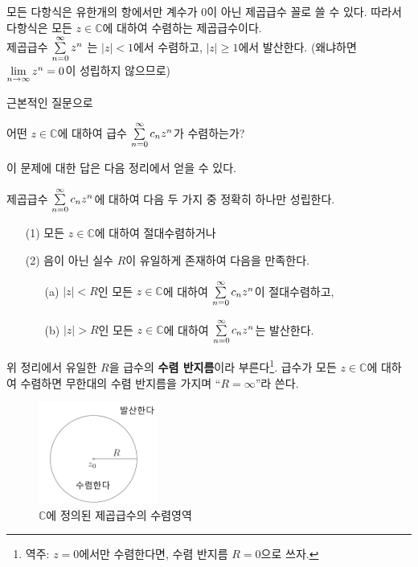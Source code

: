 \begin{saltexample}[label=example-4-1]{}{}
모든 다항식은 유한개의 항에서만 계수가 $0$이 아닌 제곱급수 꼴로 쓸 수 있다.
따라서 다항식은 모든 $z\in\mathbb C$에 대하여 수렴하는 제곱급수이다. \\[1ex]

제곱급수  
$
\sum\limits_{n=0}^\infty z^n
$
는 $|z|<1$에서 수렴하고,
$|z|\ge1$에서 발산한다. (왜냐하면 $\lim\limits_{n\to\infty} z^n = 0$이 성립하지 않으므로)
\end{saltexample}

근본적인 질문으로 
\begin{center}
어떤 $z\in\mathbb C$에 대하여  급수 $\sum\limits_{n=0}^\infty c_nz^n$가 수렴하는가?
\end{center}
이 문제에 대한 답은 다음 정리에서 얻을 수 있다.

\newpage %

\begin{salttheorem}{}{} \label{thm-4-1}
제곱급수 $\sum\limits_{n=0}^\infty c_nz^n$에 대하여
다음 두 가지 중 정확히 하나만 성립한다.
\begin{itemize}
\item[(1)] 모든 $z\in\mathbb C$에 대하여 절대수렴하거나
\item[(2)] 음이 아닌 실수 $R$이 유일하게 존재하여 다음을 만족한다.
\begin{itemize}
\item[(a)] $|z|<R$인 모든 $z\in\mathbb C$에 대하여 $\sum\limits_{n=0}^\infty c_nz^n$이 절대수렴하고,
\item[(b)] $|z|>R$인 모든 $z\in\mathbb C$에 대하여 $\sum\limits_{n=0}^\infty c_nz^n$는 발산한다.
\end{itemize}
\end{itemize}
\end{salttheorem}

위 정리에서 유일한 $R$을 급수의 \textbf{수렴 반지름}이라 
부른다\footnote{
역주:   $z=0$에서만 수렴한다면, 수렴 반지름 $R=0$으로 쓰자.
}.
급수가 모든 $z\in\mathbb C$에 대하여 수렴하면
무한대의 수렴 반지름을 가지며 ``$R=\infty$''라 쓴다.

\begin{figure}[h!]
\begin{center}
\includegraphics[width=0.35\textwidth]{./SaltChapter/figs/fig-4-1-kr}
\end{center}
\caption{$\mathbb C$에 정의된 제곱급수의 수렴영역}
\label{fig-4-1}
\end{figure}

